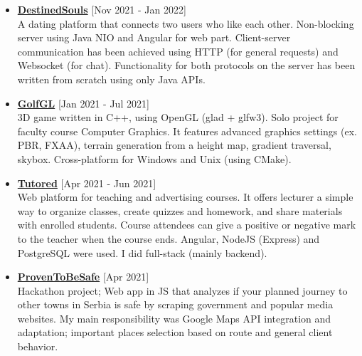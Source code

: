 \documentclass[a4paper]{moderncv}
\begin{document}
		\begin{itemize}

			\item \textbf{\href{https://github.com/MATF-Computer-Networks-Projects/2021_DestinedSouls}{DestinedSouls}} \hfill[Nov 2021 - Jan 2022]\\
			A dating platform that connects two users who like each other. Non-blocking server using Java NIO and Angular for 
			web part. Client-server communication has been achieved using HTTP (for general requests) and Websocket (for chat).
			Functionality for both protocols on the server has been written from scratch using only Java APIs.
			
			
			\item \textbf{\href{https://github.com/djordjetane/GolfGL}{GolfGL}} \hfill[Jan 2021 - Jul 2021]\\
			3D game written in C++, using OpenGL (glad + glfw3). Solo project for faculty course Computer Graphics. 
			It features advanced graphics settings (ex. PBR, FXAA), terrain generation from a height map, gradient traversal, skybox.
			Cross-platform for Windows and Unix (using CMake).

			\item \textbf{\href{https://gitlab.com/matfpveb/projekti/2020-2021/18-Tutored}{Tutored}} \hfill[Apr 2021 - Jun 2021]\\
			Web platform for teaching and advertising courses. It offers lecturer a simple way to organize classes, create quizzes and homework, and share materials with enrolled students.
			Course attendees can give a positive or negative mark to the teacher when the course ends. Angular, NodeJS (Express) and PostgreSQL were used. 
			I did full-stack (mainly backend).

			\item \textbf{\href{https://github.com/idakucamupeva/dokazano_bezbedno}{ProvenToBeSafe}} \hfill[Apr 2021]\\
			Hackathon project; Web app in JS that analyzes if your planned journey to other towns in Serbia is safe by scraping
			government and popular media websites. My main responsibility was Google Maps API integration and adaptation; 
			important places selection based on route and general client behavior.
		

\end{itemize}
\end{document}
